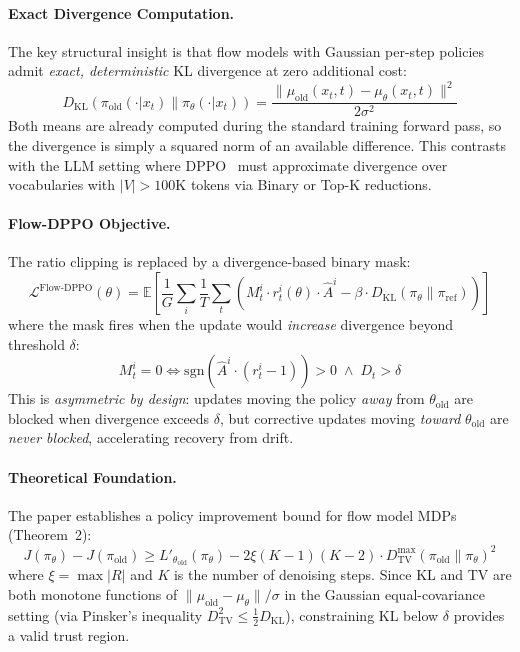 \documentclass[11pt,a4paper]{article}
\begin{document}
\paragraph{Exact Divergence Computation.} The key structural insight is that flow models with Gaussian per-step policies admit \emph{exact, deterministic} KL divergence at zero additional cost:
\begin{equation}
D_{\mathrm{KL}}(\pi_{\mathrm{old}}(\cdot|x_t) \| \pi_\theta(\cdot|x_t)) = \frac{\|\mu_{\mathrm{old}}(x_t, t) - \mu_\theta(x_t, t)\|^2}{2\sigma^2}
\end{equation}
Both means are already computed during the standard training forward pass, so the divergence is simply a squared norm of an available difference. This contrasts with the LLM setting where DPPO~\cite{qi2026dppo} must approximate divergence over vocabularies with $|V| > 100$K tokens via Binary or Top-K reductions.

\paragraph{Flow-DPPO Objective.} The ratio clipping is replaced by a divergence-based binary mask:
\begin{equation}
\mathcal{L}^{\mathrm{Flow\text{-}DPPO}}(\theta) = \mathbb{E}\left[\frac{1}{G}\sum_i \frac{1}{T}\sum_t \left(M_t^i \cdot r_t^i(\theta) \cdot \hat{A}^i - \beta \cdot D_{\mathrm{KL}}(\pi_\theta \| \pi_{\mathrm{ref}})\right)\right]
\end{equation}
where the mask fires when the update would \emph{increase} divergence beyond threshold $\delta$:
\begin{equation}
M_t^i = 0 \iff \mathrm{sgn}(\hat{A}^i \cdot (r_t^i - 1)) > 0 \;\wedge\; D_t > \delta
\end{equation}
This is \emph{asymmetric by design}: updates moving the policy \emph{away} from $\theta_{\mathrm{old}}$ are blocked when divergence exceeds $\delta$, but corrective updates moving \emph{toward} $\theta_{\mathrm{old}}$ are \emph{never blocked}, accelerating recovery from drift.

\paragraph{Theoretical Foundation.} The paper establishes a policy improvement bound for flow model MDPs (Theorem~2):
\begin{equation}
J(\pi_\theta) - J(\pi_{\mathrm{old}}) \geq L'_{\theta_{\mathrm{old}}}(\pi_\theta) - 2\xi(K\!-\!1)(K\!-\!2) \cdot D_{\mathrm{TV}}^{\max}(\pi_{\mathrm{old}} \| \pi_\theta)^2
\end{equation}
where $\xi = \max|R|$ and $K$ is the number of denoising steps. Since KL and TV are both monotone functions of $\|\mu_{\mathrm{old}} - \mu_\theta\|/\sigma$ in the Gaussian equal-covariance setting (via Pinsker's inequality $D_{\mathrm{TV}}^2 \leq \frac{1}{2}D_{\mathrm{KL}}$), constraining KL below $\delta$ provides a valid trust region.
\end{document}
